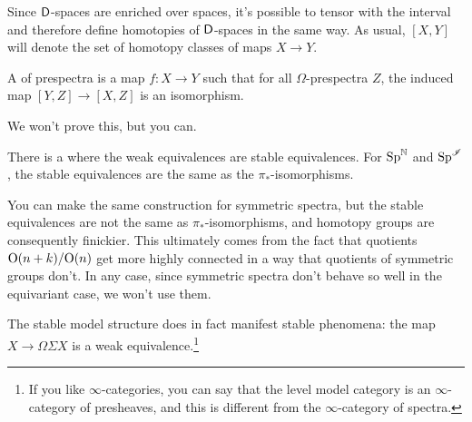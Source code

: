 Since $\mathsf D$-spaces are enriched over spaces, it's possible to tensor with the interval and therefore define
homotopies of $\mathsf D$-spaces in the same way. As usual, $[X,Y]$ will denote the set of homotopy classes of maps $X\to
Y$.
\begin{defn}
A  of prespectra is a map $f\colon X\to Y$ such that for all $\Omega$-prespectra $Z$, the
induced map $[Y,Z]\to[X,Z]$ is an isomorphism.
\end{defn}
We won't prove this, but you can.
\begin{thm}
There is a  where the weak equivalences are stable equivalences. For $\mathrm{Sp}^\mathbb N$ and
$\mathrm{Sp}^\mathscr I$, the stable equivalences are the same as the $\pi_*$-isomorphisms.
\end{thm}
\begin{rem}
You can make the same construction for symmetric spectra, but the stable equivalences are not the same as
$\pi_*$-isomorphisms, and homotopy groups are consequently finickier. This ultimately comes from the fact that
quotients $\mathrm O(n+k)/\mathrm O(n)$ get more highly connected in a way that quotients of symmetric groups don't. In any case,
since symmetric spectra don't behave so well in the equivariant case, we won't use them.
\end{rem}
The stable model structure does in fact manifest stable phenomena: the map $X\to\Omega\Sigma X$ is a weak
equivalence.\footnote{If you like $\infty$-categories, you can say that the level model category is an
$\infty$-category of presheaves, and this is different from the $\infty$-category of spectra.}

